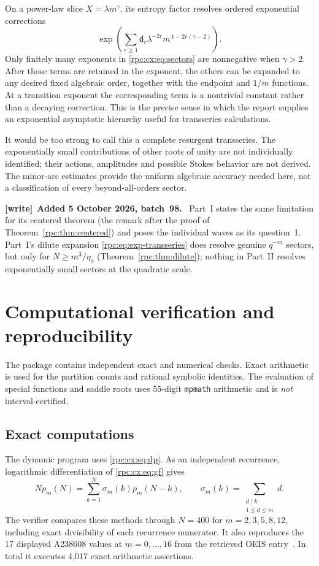 \documentclass[11pt]{article}
\theoremstyle{definition}
\theoremstyle{remark}
\numberwithin{equation}{section}
\newenvironment{writenote}[1][]{\par\smallskip\begingroup\small
 \noindent\textbf{[write]}\if\relax\detokenize{#1}\relax\else~\textbf{#1.}\fi\ }%
 {\par\endgroup\smallskip}
\begin{document}
On a power-law slice $X=\lambda m^\gamma$, its entropy factor resolves
ordered exponential corrections
\begin{equation}\label{rpc:cx:eq:sectors}
 \exp\left(\sum_{r\ge1}
 \mathsf d_r\lambda^{-2r}m^{\,1-2r(\gamma-2)}\right).
\end{equation}
Only finitely many exponents in \eqref{rpc:cx:eq:sectors} are nonnegative when
$\gamma>2$. After those terms are retained in the exponent, the others
can be expanded to any desired fixed algebraic order, together with
the endpoint and $1/m$ functions. At a transition exponent the
corresponding term is a nontrivial constant rather than a decaying
correction. This is the precise sense in which the report supplies an
exponential asymptotic hierarchy useful for transseries calculations.

It would be too strong to call this a complete resurgent transseries.
The exponentially small contributions of other roots of unity are
not individually identified; their actions, amplitudes and possible
Stokes behavior are not derived. The minor-arc estimates provide the
uniform algebraic accuracy needed here, not a classification of every
beyond-all-orders sector.

\begin{writenote}[Added 5 October 2026, batch~98]
Part~I states the same limitation for its centered theorem (the remark after
the proof of Theorem~\ref{rpc:thm:centered}) and poses the individual waves
as its question~1. Part~I's dilute expansion \eqref{rpc:eq:exp-transseries}
does resolve genuine $q^{-m}$ sectors, but only for $N\ge m^3/\eta_0$
(Theorem~\ref{rpc:thm:dilute}); nothing in Part~II resolves exponentially
small sectors at the quadratic scale.
\end{writenote}

\section{Computational verification and reproducibility}\label{rpc:cx:sec:checks}
The package contains independent exact and numerical checks. Exact
arithmetic is used for the partition counts and rational symbolic
identities. The evaluation of special functions and saddle roots uses
55-digit \texttt{mpmath} arithmetic and is \emph{not} interval-certified.

\subsection{Exact computations}
The dynamic program uses \eqref{rpc:cx:eq:dp}. As an independent recurrence,
logarithmic differentiation of \eqref{rpc:cx:eq:gf} gives
\begin{equation}\label{rpc:cx:eq:divisor-rec}
 Np_m(N)=\sum_{k=1}^N\sigma_m(k)p_m(N-k),\qquad
 \sigma_m(k)=\sum_{\substack{d\mid k\\1\le d\le m}}d.
\end{equation}
The verifier compares these methods through $N=400$ for
$m=2,3,5,8,12$, including exact divisibility of each recurrence
numerator. It also reproduces the 17 displayed A238608 values at
$m=0,\ldots,16$ from the retrieved OEIS entry~\cite{oeis238608}.
In total it executes 4,017 exact arithmetic assertions.
\end{document}

